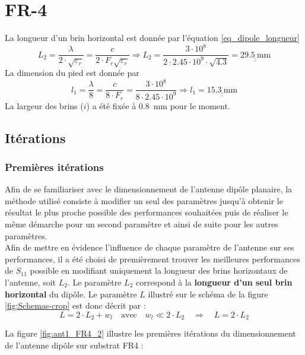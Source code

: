 \documentclass[Deriaz_Traiber_Labo02]{subfiles}
\begin{document}
\section{FR-4}
La longueur d'un brin horizontal est donnée par l'équation \ref{eq_dipole_longueur}
\begin{equation}
\boxed{L_2 = \dfrac{\lambda}{2 \cdot \sqrt{\varepsilon_r}} = \dfrac{c}{2 \cdot F_r \sqrt{\varepsilon_r}}} \Rightarrow L_2 = \dfrac{3\cdot10^8}{2\cdot2.45\cdot1 0^9\cdot \sqrt{4.3}} = \underline{\underline{\SI{29.5}{\milli\meter}}}
\label{eq_dipole_longueur}
\end{equation}
La dimension du pied est donnée par
\begin{equation}
\boxed{l_1=\frac{\lambda}{8}=\frac{c}{8 \cdot F_r}} = \frac{3\cdot 10^8}{8\cdot 2.45\cdot 10^9} \Rightarrow l_1 = \underline{\underline{\SI{15.3}{\milli\meter}}}
\end{equation}
La largeur des brins ($i$) a été fixée à \SI{0.8}{\milli\meter} pour le moment.
\subsection{Itérations}
\subsubsection{Premières itérations}

Afin de se familiariser avec le dimensionnement de l'antenne dipôle planaire, la méthode utilisé consiste à modifier un seul des paramètres jusqu'à obtenir le résultat le plus proche possible des performances souhaitées puis de réaliser le même démarche pour un second paramètre et ainsi de suite pour les autres paramètres.\\

Afin de mettre en évidence l'influence de chaque paramètre de l'antenne sur ses performances, il a été choisi de premièrement trouver les meilleures performances de $S_{11}$ possible en modifiant uniquement la longueur des brins horizontaux de l'antenne, soit $L_2$. Le paramètre $L_2$ correspond à la \textbf{longueur d'un seul brin horizontal} du dipôle. Le paramètre $L$ illustré sur le schéma de la figure \ref{fig:Schemas-crop} est donc décrit par :
$$
L = 2\cdot L_2 + w_l 	\quad \text{avec} \quad  w_l \ll 2 \cdot L_2  \quad \Rightarrow \quad \boxed{L = 2\cdot L_2}
$$

\pagebreak

\begin{flushleft}
La figure \ref{fig:ant1_FR4_2} illustre les premières itérations du dimensionnement de l'antenne dipôle sur substrat FR4 :
\end{flushleft}
\end{document}
